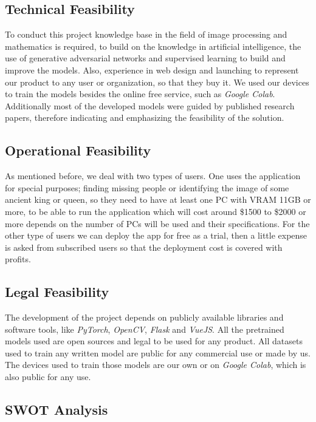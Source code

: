 \subsection{Technical Feasibility}

To conduct this project knowledge base in the field of image processing and mathematics is required, to build on the knowledge in artificial intelligence, the use of generative adversarial networks and supervised learning to build and improve the models. Also, experience in web design and launching to represent our product to any user or organization, so that they buy it. We used our devices to train the models besides the online free service, such as \emph{Google Colab}. Additionally most of the developed models were guided by published research papers, therefore indicating and emphasizing the feasibility of the solution.

\subsection{Operational Feasibility}

As mentioned before, we deal with two types of users. One uses the application for special purposes; finding missing people or identifying the image of some ancient king or queen, so they need to have at least one PC with VRAM 11GB or more, to be able to run the application which will cost around \$1500 to \$2000 or more depends on the number of PCs will be used and their specifications. For the other type of users we can deploy the app for free as a trial, then a little expense is asked from subscribed users so that the deployment cost is covered with profits. 

\subsection{Legal Feasibility}

The development of the project depends on publicly available libraries and software tools, like \emph{PyTorch}, \emph{OpenCV}, \emph{Flask} and \emph{VueJS}. All the pretrained models used are open sources and legal to be used for any product. All datasets used to train any written model are public for any commercial use or made by us. The devices used to train those models are our own or on \emph{Google Colab}, which is also public for any use.

\subsection{ SWOT Analysis }

